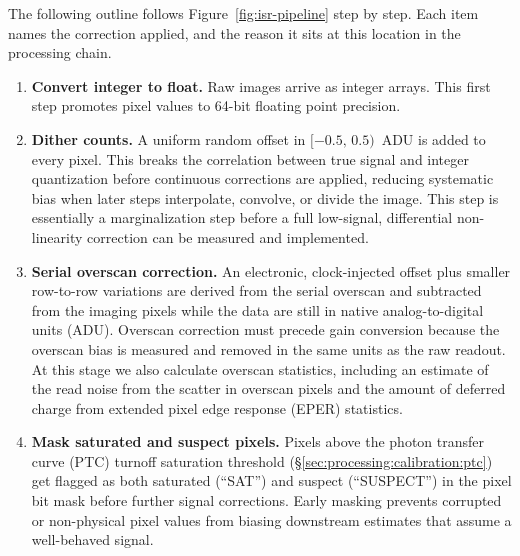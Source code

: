 The following outline follows Figure~\ref{fig:isr-pipeline} step by step.
Each item names the correction applied, and the reason it sits at this location in the processing chain.

\begin{enumerate}
    \item \textbf{Convert integer to float.}
    Raw images arrive as integer arrays. This first step promotes pixel values to 64-bit floating point precision.

    \item \textbf{Dither counts.}
    A uniform random offset in $[-0.5,\,0.5)$~ADU is added to every pixel.
    This breaks the correlation between true signal and integer quantization before continuous corrections are applied, reducing systematic bias when later steps interpolate, convolve, or divide the image. 
    This step is essentially a marginalization step before a full low-signal, differential non-linearity correction can be measured and implemented.

    \item \textbf{Serial overscan correction.}
    An electronic, clock-injected offset plus smaller row-to-row variations are derived from the serial overscan and subtracted from the imaging pixels while the data are still in native analog-to-digital units (ADU).
    Overscan correction must precede gain conversion because the overscan bias is measured and removed in the same units as the raw readout. 
    At this stage we also calculate overscan statistics, including an estimate of the read noise from the scatter in overscan pixels and the amount of deferred charge from extended pixel edge response (EPER) statistics.

    \item \textbf{Mask saturated and suspect pixels.}
    Pixels above the photon transfer curve (PTC) turnoff saturation threshold (\S\ref{sec:processing:calibration:ptc}) get flagged as both saturated (``SAT'') and suspect (``SUSPECT'') in the pixel bit mask before further signal corrections.
    Early masking prevents corrupted or non-physical pixel values from biasing downstream estimates that assume a well-behaved signal.


\end{enumerate}
